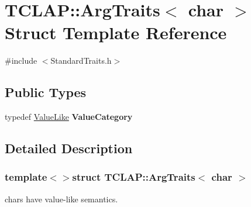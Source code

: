 \hypertarget{struct_t_c_l_a_p_1_1_arg_traits_3_01char_01_4}{\section{T\+C\+L\+A\+P\+:\+:Arg\+Traits$<$ char $>$ Struct Template Reference}
\label{struct_t_c_l_a_p_1_1_arg_traits_3_01char_01_4}
}


{\ttfamily \#include $<$Standard\+Traits.\+h$>$}

\subsection*{Public Types}
\begin{DoxyCompactItemize}
\item 
\hypertarget{struct_t_c_l_a_p_1_1_arg_traits_3_01char_01_4_a36f7fe1b3b1649ef8ec08ef7d6fc3160}{typedef \hyperlink{struct_t_c_l_a_p_1_1_value_like}{Value\+Like} {\bfseries Value\+Category}}\label{struct_t_c_l_a_p_1_1_arg_traits_3_01char_01_4_a36f7fe1b3b1649ef8ec08ef7d6fc3160}

\end{DoxyCompactItemize}


\subsection{Detailed Description}
\subsubsection*{template$<$$>$struct T\+C\+L\+A\+P\+::\+Arg\+Traits$<$ char $>$}

chars have value-\/like semantics. 